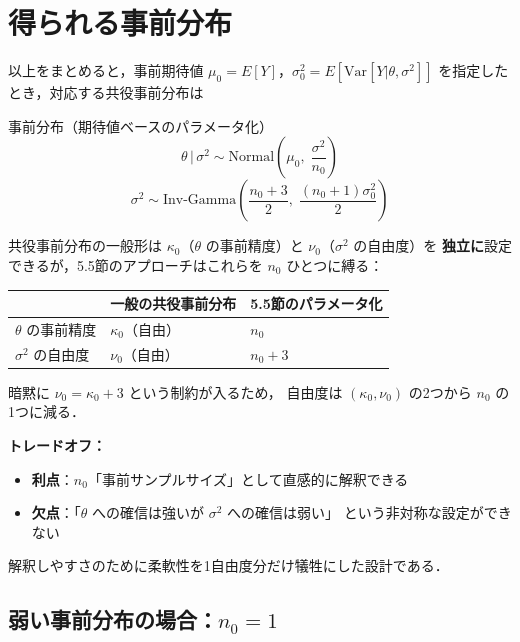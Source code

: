 \documentclass[lualatex,ja=standard,a4paper,12pt]{bxjsarticle}
\begin{document}
\section{得られる事前分布}

以上をまとめると，事前期待値 $\mu_0 = E[Y]$，$\sigma_0^2 = E[\mathrm{Var}[Y|\theta,\sigma^2]]$
を指定したとき，対応する共役事前分布は

\begin{thmbox}{事前分布（期待値ベースのパラメータ化）}
\[
  \theta\,|\,\sigma^2 \sim \mathrm{Normal}\!\left(\mu_0,\; \frac{\sigma^2}{n_0}\right)
\]
\[
  \sigma^2 \sim \mathrm{Inv\text{-}Gamma}\!\left(\frac{n_0+3}{2},\; \frac{(n_0+1)\sigma_0^2}{2}\right)
\]
\end{thmbox}

\noindent
共役事前分布の一般形は $\kappa_0$（$\theta$ の事前精度）と $\nu_0$（$\sigma^2$ の自由度）を
\textbf{独立に}設定できるが，5.5節のアプローチはこれらを $n_0$ ひとつに縛る：

\begin{center}
\renewcommand{\arraystretch}{1.4}
\begin{tabular}{lll}
\toprule
 & 一般の共役事前分布 & 5.5節のパラメータ化 \\
\midrule
$\theta$ の事前精度 & $\kappa_0$（自由） & $n_0$ \\
$\sigma^2$ の自由度 & $\nu_0$（自由） & $n_0 + 3$ \\
\bottomrule
\end{tabular}
\end{center}

\noindent 暗黙に $\nu_0 = \kappa_0 + 3$ という制約が入るため，
自由度は $(\kappa_0, \nu_0)$ の2つから $n_0$ の1つに減る．

\begin{pointbox}
\textbf{トレードオフ：}
\begin{itemize}
  \item \textbf{利点}：$n_0$「事前サンプルサイズ」として直感的に解釈できる
  \item \textbf{欠点}：「$\theta$ への確信は強いが $\sigma^2$ への確信は弱い」
        という非対称な設定ができない
\end{itemize}
解釈しやすさのために柔軟性を1自由度分だけ犠牲にした設計である．
\end{pointbox}

\subsection*{弱い事前分布の場合：$n_0 = 1$}
\end{document}
